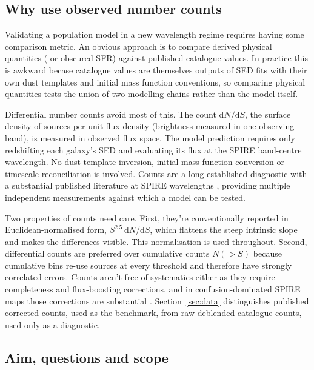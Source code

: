 \documentclass[12pt,a4paper]{article}
\begin{document}
\subsection{Why use observed number counts}
\label{sec:intro:counts}

Validating a population model in a new wavelength regime requires having some comparison
metric. An obvious approach is to compare derived physical quantities (\LIR{} or
obscured SFR) against published catalogue values. In practice this is awkward becase catalogue
\LIR{} values are themselves outputs of SED fits with their own dust templates and
initial mass function conventions, so comparing physical quantities tests the union of
two modelling chains rather than the model itself.

Differential number counts avoid most of this. The count $\mathrm{d}N/\mathrm{d}S$, the
surface density of sources per unit flux density (brightness measured in one observing
band), is measured in observed flux space. The model prediction requires only
redshifting each galaxy's SED and evaluating its flux at the SPIRE band-centre
wavelength. No dust-template inversion, initial mass function conversion or timescale
reconciliation is involved. Counts are a long-established diagnostic with a substantial
published literature at SPIRE wavelengths \citep{Clements_2010, Oliver_2010,
Glenn_2010, B_thermin_2010}, providing multiple independent measurements against which a
model can be tested.

Two properties of counts need care. First, they're conventionally reported in
Euclidean-normalised form, $S^{2.5}\,\mathrm{d}N/\mathrm{d}S$, which flattens the
steep intrinsic slope and makes the differences visible. This normalisation is used
throughout. Second, differential counts are preferred over cumulative counts $N(>S)$
because cumulative bins re-use sources at every threshold and therefore have strongly
correlated errors. Counts aren't free of systematics either as they require completeness
and flux-boosting corrections, and in confusion-dominated SPIRE maps those corrections
are substantial \citep{Nguyen_2010, Roseboom_2010}.
Section~\ref{sec:data} distinguishes published corrected counts, used as
the benchmark, from raw deblended catalogue counts, used only as a diagnostic.

\subsection{Aim, questions and scope}
\label{sec:intro:aims}
\end{document}
